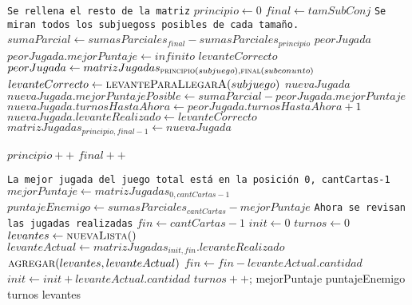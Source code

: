 \documentclass[11pt, a4paper, twoside]{article}
\begin{document}
\begin{algorithm}[H]
\begin{algorithmic}[1]
	\Statex
	\Statex \texttt{Se rellena el resto de la matriz}
		\State $principio \gets 0$
		\State $final \gets tamSubConj$
		\Statex \hspace{0.37cm} \texttt{Se miran todos los subjuegoss posibles de cada tamaño.}
			\State $sumaParcial \gets sumasParciales_{final} - sumasParciales_{principio}$
			\State $peorJugada$
			\State $peorJugada.mejorPuntaje \gets infinito$
			\State $levanteCorrecto$
					\State $peorJugada \gets matrizJugadas_{\Call{principio}{subjuego}, \Call{final}{subconunto}}$
					\State $levanteCorrecto \gets \Call{levanteParaLlegarA}{subjuego}$
				\EndIf
			\EndFor
			\State $nuevaJugada$
			\State $nuevaJugada.mejorPuntajePosible \gets sumaParcial - peorJugada.mejorPuntaje$
			\State $nuevaJugada.turnosHastaAhora \gets peorJugada.turnosHastaAhora +1$
			\State $nuevaJugada.levanteRealizado \gets levanteCorrecto$
			\State $matrizJugadas_{principio,final-1} \gets nuevaJugada$
			
			\State $principio++$
			\State $final++$
		\EndWhile
	\EndFor
{}
\end{algorithmic}
\end{algorithm}


\begin{algorithm}[H]
\footnotesize\begin{algorithmic}[1]
	\Statex \texttt{La mejor jugada del juego total está en la posición 0, cantCartas-1}
	\State $mejorPuntaje \gets matrizJugadas_{0, cantCartas -1}$
	\State $puntajeEnemigo \gets sumasParciales_{cantCartas} - mejorPuntaje$
	\Statex
	\Statex \texttt{Ahora se revisan las jugadas realizadas}
	\State $fin \gets cantCartas -1$
	\State $init \gets 0$
	\State $turnos \gets 0$
	\State $ levantes \gets \Call{nuevaLista}$
		\State $levanteActual \gets matrizJugadas_{init,fin}.levanteRealizado$
		\State $\Call{agregar}{levantes, levanteActual}$
			\State $fin \gets fin - levanteActual.cantidad $
		\Else
			\State $init \gets init + levanteActual.cantidad $
		\EndIf
		\State $turnos++$;
	\EndWhile
	\State \Return mejorPuntaje
	\State \Return puntajeEnemigo
	\State \Return turnos
	\State \Return levantes
\end{algorithmic}
\end{algorithm}
\end{document}
